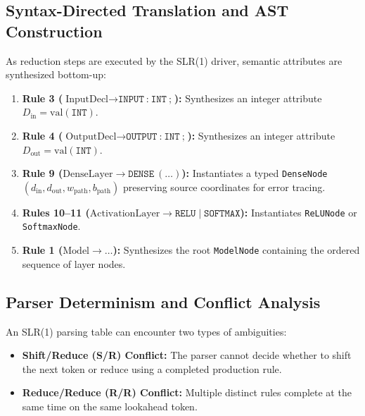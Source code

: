 \documentclass[11pt,a4paper]{article}
\begin{document}
\subsection{Syntax-Directed Translation and AST Construction}
\label{sec:syntax_directed_translation}
As reduction steps are executed by the SLR(1) driver, semantic attributes are synthesized bottom-up:
\begin{enumerate}
    \item \textbf{Rule 3 ($\text{InputDecl} \rightarrow \texttt{INPUT} \ \texttt{:} \ \texttt{INT} \ \texttt{;}$):} Synthesizes an integer attribute $D_{\text{in}} = \text{val}(\texttt{INT})$.
    \item \textbf{Rule 4 ($\text{OutputDecl} \rightarrow \texttt{OUTPUT} \ \texttt{:} \ \texttt{INT} \ \texttt{;}$):} Synthesizes an integer attribute $D_{\text{out}} = \text{val}(\texttt{INT})$.
    \item \textbf{Rule 9 ($\text{DenseLayer} \rightarrow \texttt{DENSE} \ (\dots)$):} Instantiates a typed \texttt{DenseNode}$(d_{\text{in}}, d_{\text{out}}, w_{\text{path}}, b_{\text{path}})$ preserving source coordinates for error tracing.
    \item \textbf{Rules 10--11 ($\text{ActivationLayer} \rightarrow \texttt{RELU} \mid \texttt{SOFTMAX}$):} Instantiates \texttt{ReLUNode} or \texttt{SoftmaxNode}.
    \item \textbf{Rule 1 ($\text{Model} \rightarrow \dots$):} Synthesizes the root \texttt{ModelNode} containing the ordered sequence of layer nodes.
\end{enumerate}

\subsection{Parser Determinism and Conflict Analysis}
An SLR(1) parsing table can encounter two types of ambiguities:
\begin{itemize}[leftmargin=*]
    \item \textbf{Shift/Reduce (S/R) Conflict:} The parser cannot decide whether to shift the next token or reduce using a completed production rule.
    \item \textbf{Reduce/Reduce (R/R) Conflict:} Multiple distinct rules complete at the same time on the same lookahead token.
\end{itemize}
\end{document}
